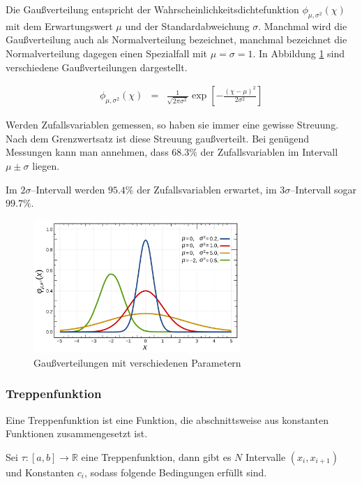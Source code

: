 \documentclass[12pt,a4paper]{scrartcl}
\numberwithin{equation}{section} %
\begin{document}
	Die Gaußverteilung entspricht der Wahrscheinlichkeitsdichtefunktion $\phi_{\mu,\sigma^2}(\chi)$ mit dem Erwartungswert $\mu$ und der Standardabweichung $\sigma$. Manchmal wird die Gaußverteilung auch als Normalverteilung bezeichnet, manchmal bezeichnet die Normalverteilung dagegen einen Spezialfall mit $\mu=\sigma=1$. In Abbildung \ref{abb:gaussians} sind verschiedene Gaußverteilungen dargestellt.
	
	\begin{eqnarray}
		\phi_{\mu,\sigma^2}(\chi) &=&
		\frac{1}{\sqrt{2\pi\sigma^2}}
		\exp\left[
		-
		\frac{(\chi - \mu)^2}{2\sigma^2}
		\right]
	\end{eqnarray}
	
	\noindent
	Werden Zufallsvariablen gemessen, so haben sie immer eine gewisse Streuung. Nach dem Grenzwertsatz ist diese Streuung gaußverteilt. Bei genügend Messungen kann man annehmen, dass $68.3\%$ der Zufallsvariablen im Intervall $\mu\pm\sigma$ liegen.
	
	Im $2\sigma$--Intervall werden $95.4\%$ der Zufallsvariablen erwartet, im $3\sigma$--Intervall sogar $99.7\%$.
	
	\begin{figure}[h]
		\centering
		\includegraphics[width=0.7\textwidth]{../media/B1.1/Gaussverteilungen.pdf}
		\caption{Gaußverteilungen mit verschiedenen Parametern \cite{abb:gaussians}}
		\label{abb:gaussians}
	\end{figure}
	
	\hypertarget{treppenfunktion}{%
		\subsubsection{Treppenfunktion}\label{treppenfunktion}}
	
	Eine Treppenfunktion ist eine Funktion, die abschnittsweise aus konstanten Funktionen zusammengesetzt ist.
	
	Sei $\tau:[a,b]\rightarrow \mathbb R$ eine Treppenfunktion, dann gibt es $N$ Intervalle $(x_i, x_{i+1})$ und Konstanten $c_i$, sodass folgende Bedingungen erfüllt sind. \cite{Einsiedler}
	
\end{document}
